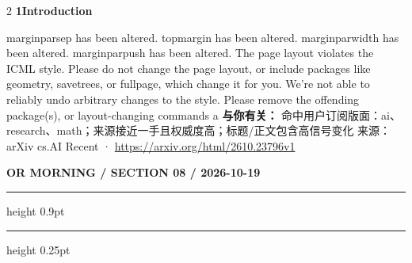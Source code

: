 \documentclass[10.5pt]{ctexart}
\begin{document}
\begin{multicols}{2}
\vspace{2mm}
{\large\bfseries 1Introduction}\par
marginparsep has been altered. topmargin has been altered. marginparwidth has been altered. marginparpush has been altered. The page layout violates the ICML style. Please do not change the page layout, or include packages like geometry, savetrees, or fullpage, which change it for you. We’re not able to reliably undo arbitrary changes to the style. Please remove the offending package(s), or layout-changing commands a
\textbf{与你有关：} 命中用户订阅版面：ai、research、math；来源接近一手且权威度高；标题/正文包含高信号变化
{\footnotesize\color{ormuted} 来源：arXiv cs.AI Recent · \url{https://arxiv.org/html/2610.23796v1}}
\end{multicols}
\newpage
{\small\bfseries OR MORNING / SECTION 08 / 2026-10-19}
\vspace{2mm}
\hrule height 0.9pt
\vspace{1.5mm}
\hrule height 0.25pt
\vspace{4mm}
\end{document}
